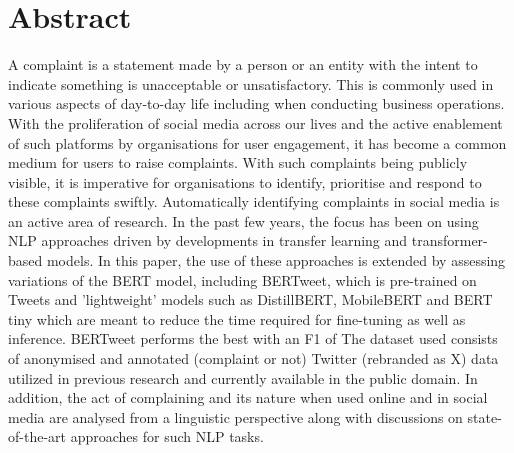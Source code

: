 \chapter*{\Large \center Abstract}

A complaint is a statement made by a person or an entity with the intent to indicate something is unacceptable or unsatisfactory. This is commonly used in various aspects of day-to-day life including when conducting business operations. With the proliferation of social media across our lives and the active enablement of such platforms by organisations for user engagement, it has become a common medium for users to raise complaints. With such complaints being publicly visible, it is imperative for organisations to identify, prioritise and respond to these complaints swiftly. Automatically identifying complaints in social media is an active area of research. In the past few years, the focus has been on using NLP approaches driven by developments in transfer learning and transformer-based models.
\newline \newline
In this paper, the use of these approaches is extended by assessing variations of the BERT model, including BERTweet, which is pre-trained on Tweets and 'lightweight' models such as DistillBERT, MobileBERT and BERT tiny which are meant to reduce the time required for fine-tuning as well as inference. BERTweet performs the best with an F1 of The dataset used consists of anonymised and annotated (complaint or not) Twitter (rebranded as X) data utilized in previous research and currently available in the public domain. In addition, the act of complaining and its nature when used online and in social media are analysed from a linguistic perspective along with discussions on state-of-the-art approaches for such NLP tasks.
\newline \newline
